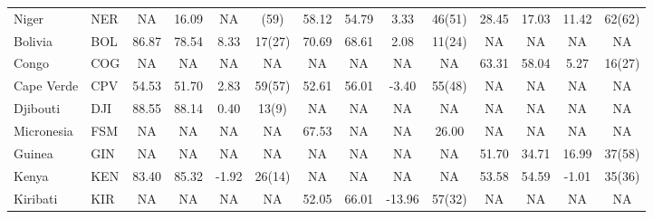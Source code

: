 {\begin{longtable}{m{2.3cm}lcccc|cccc|cccc}
Niger                             & NER           & NA               & 16.09              & NA               & (59)             & 58.12    & 54.79      & 3.33     & 46(51)   & 28.45           & 17.03             & 11.42           & 62(62)          \\
Bolivia                           & BOL           & 86.87            & 78.54              & 8.33             & 17(27)           & 70.69    & 68.61      & 2.08     & 11(24)   & NA              & NA                & NA              & NA              \\
Congo                             & COG           & NA               & NA                 & NA               & NA               & NA       & NA         & NA       & NA       & 63.31           & 58.04             & 5.27            & 16(27)          \\
Cape Verde                        & CPV           & 54.53            & 51.70              & 2.83             & 59(57)           & 52.61    & 56.01      & -3.40    & 55(48)   & NA              & NA                & NA              & NA              \\
Djibouti                          & DJI           & 88.55            & 88.14              & 0.40             & 13(9)            & NA       & NA         & NA       & NA       & NA              & NA                & NA              & NA              \\
Micronesia                        & FSM           & NA               & NA                 & NA               & NA               & 67.53    & NA         & NA       & 26.00    & NA              & NA                & NA              & NA              \\
Guinea                            & GIN           & NA               & NA                 & NA               & NA               & NA       & NA         & NA       & NA       & 51.70           & 34.71             & 16.99           & 37(58)          \\
Kenya                             & KEN           & 83.40            & 85.32              & -1.92            & 26(14)           & NA       & NA         & NA       & NA       & 53.58           & 54.59             & -1.01           & 35(36)          \\
Kiribati                          & KIR           & NA               & NA                 & NA               & NA               & 52.05    & 66.01      & -13.96   & 57(32)   & NA              & NA                & NA              & NA              \\

\end{longtable}}

